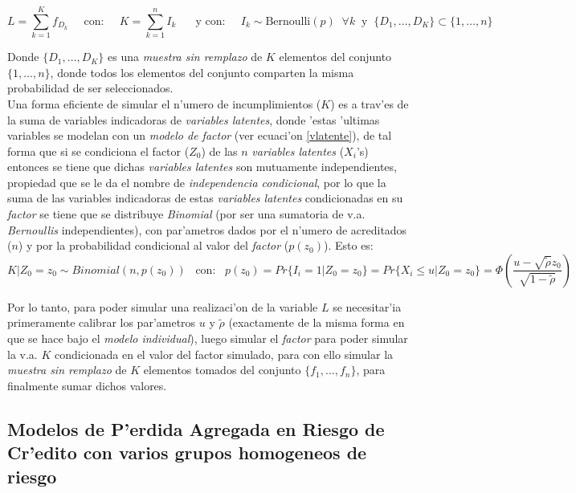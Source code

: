 \documentclass[10pt, oneside]{article}
\begin{document}
\begin{enumerate}
\[L = \sum_{k=1}^{K} f_{D_k}\;\;\;\;\;\mbox{con:}\;\;\;\;\; K=\sum_{k=1}^{n} I_k\;\;\;\;\;\mbox{ y con:}\;\;\;\;\;I_k\sim\mbox{Bernoulli}(p) \;\; \forall k \;\; \mbox{y}\;\; \{D_1,\ldots, D_K\} \subset \{1, \ldots, n\}\]

\noindent
Donde $\{D_1,\ldots, D_K\}$ es una \emph{muestra sin remplazo} de $K$ elementos del conjunto $\{1, \ldots, n\}$, donde todos los elementos del conjunto comparten la misma probabilidad de ser seleccionados.\\

Una forma eficiente de simular el n'umero de incumplimientos ($K$) es a trav'es de la suma de variables indicadoras de \emph{variables latentes}, donde 'estas 'ultimas variables se modelan con un \emph{modelo de factor} (ver ecuaci'on \ref{vlatente}), de tal forma que si se condiciona el factor ($Z_0$) de las $n$ \emph{variables latentes} ($X_i$'s) entonces se tiene que dichas \emph{variables latentes} son mutuamente independientes, propiedad que se le da el nombre de \emph{independencia condicional}, por lo que la suma de las variables indicadoras de estas \emph{variables latentes} condicionadas en su \emph{factor} se tiene que se distribuye \emph{Binomial} (por ser una sumatoria de v.a. \emph{Bernoullis} independientes), con par'ametros dados por el n'umero de acreditados ($n$) y por la probabilidad condicional al valor del \emph{factor} ($p(z_0)$). Esto es:\\

\[K|Z_0 = z_0 \sim Binomial(n,p(z_0)) \;\;\;\mbox{con:}\;\;\; p(z_0) = Pr\{I_i = 1 | Z_0 = z_0\} =Pr\{X_i \leq u | Z_0 = z_0\} = \Phi \left( \frac{u-\sqrt{\widetilde{\rho}} z_0}{\sqrt{1-\widetilde{\rho}}} \right) \]

\noindent
Por lo tanto, para poder simular una realizaci'on de la variable $L$ se necesitar'ia primeramente calibrar los par'ametros $u$ y $\widetilde{\rho}$ (exactamente de la misma forma en que se hace bajo el \emph{modelo individual}), luego simular el \emph{factor} para poder simular la v.a. $K$ condicionada en el valor del factor simulado, para con ello simular la \emph{muestra sin remplazo} de $K$ elementos tomados del conjunto $\{f_1, \ldots, f_n\}$, para finalmente sumar dichos valores.\\

\end{enumerate}

\subsection*{Modelos de P'erdida Agregada en Riesgo de Cr'edito con varios grupos homogeneos de riesgo}
\end{document}
